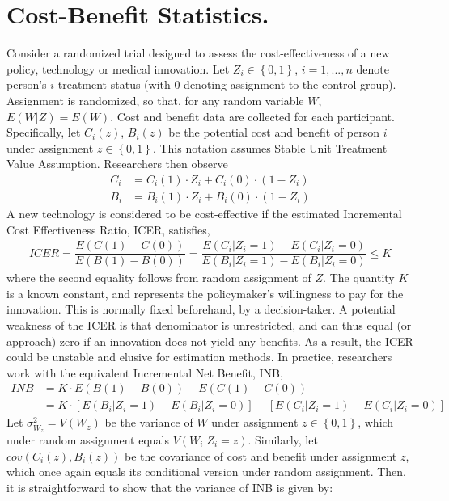 \documentclass[english, 11pt,a4paper, ]{article}
\begin{document}
 


\section{Cost-Benefit Statistics. }
Consider a randomized trial  designed to assess the cost-effectiveness of a new policy, technology or medical innovation. Let $Z_i\in\left\{0,1\right\}$, $i=1,...,n$ denote  person's $i$ treatment status (with 0 denoting assignment to the control group). Assignment is randomized, so that, for any random variable $W$, $E(W|Z)=E(W)$. Cost and benefit data are collected for each participant. Specifically, let $C_i(z)$, $B_i(z)$ be the potential cost and benefit of person $i$ under assignment $z\in\left\{0,1\right\}$. This notation assumes Stable Unit Treatment Value Assumption. Researchers then observe 
\begin{align}
	C_i&=C_i(1)\cdot Z_i + C_i(0)\cdot (1-Z_i) \\
	B_i&=B_i(1)\cdot Z_i + B_i(0)\cdot (1-Z_i)
\end{align}
A new technology is considered to be cost-effective if the estimated Incremental Cost Effectiveness Ratio, ICER, satisfies,
\begin{align}
	ICER =\dfrac{E(C(1)-C(0))}{E(B(1)-B(0))}=\dfrac{E(C_i|Z_i=1)-E(C_i|Z_i=0)}{E(B_i|Z_i=1)-E(B_i|Z_i=0)} \leq K
\end{align}
where the second equality follows from random assignment of $Z$. The quantity $ K $ is a known constant,  and represents the policymaker's willingness to pay for the innovation. This is normally fixed beforehand, by a decision-taker. A potential weakness of the ICER is that denominator is unrestricted, and can thus equal (or approach) zero if an innovation does not yield any benefits. As a result, the ICER could be unstable and elusive for estimation methods.  In practice, researchers work with the equivalent Incremental Net Benefit, INB, 
\begin{align}
	INB &=  K\cdot E(B(1)-B(0)) - E(C(1)-C(0))  \nonumber \\
&= K\cdot \left[ E(B_i|Z_i=1)-E(B_i|Z_i=0)\right] - \left[E(C_i|Z_i=1)-E(C_i|Z_i=0)\right] 
\end{align}
 Let $\sigma^2_{W_z} = V(W_z)$ be the variance of $W$ under assignment $z\in\left\{0,1\right\}$, which under random assignment equals $V(W_i|Z_i=z)$.  Similarly, let $cov(C_i(z),B_i(z))$ be the covariance of cost and benefit under assignment $z$, which once again equals its conditional version under random assignment. Then, it is straightforward to show that the variance of INB is given by:
\end{document}
